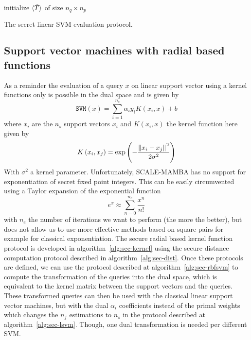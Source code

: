 \begin{center}
\begin{algorithm}[H]
\DontPrintSemicolon
initialize $\langle \tilde{T} \rangle$ of size $n_q \times n_p$ \;
\caption{The secret linear SVM evaluation protocol.}
\label{alg:sec-lsvm}
\end{algorithm}
\end{center}

\subsection{Support vector machines with radial based functions}
As a reminder the evaluation of a query $x$ on linear support vector using a kernel functions only is possible in the dual space and is given by
\begin{equation}
    \mathtt{SVM}(x) = \sum_{i=1}^{n_s} \alpha_i y_i K(x_i,x) + b
\end{equation}
where $x_i$ are the $n_s$ support vectors $x_i$ and $K(x_i,x)$ the kernel function here given by
\begin{equation}
    K\left( x_i,x_j\right) = \exp\left(-\frac{\left\lVert x_i - x_j\right\rVert^2}{2\sigma^2}\right)
\end{equation}
With $\sigma^2$ a kernel parameter. Unfortunately, SCALE-MAMBA has no support for exponentiation of secret fixed point integers. This can be easily circumvented using a Taylor expansion of the exponential function
\begin{equation}
    e^x \approx \sum_{n=0}^{n_e} \frac{x^n}{n!}
\end{equation}
with $n_e$ the number of iterations we want to perform (the more the better), but does not allow us to use more effective methods based on square pairs for example for classical exponentiation. The secure radial based kernel function protocol is developed in algorithm~\ref{alg:sec-kernel} using the secure distance computation protocol described in algorithm~\ref{alg:sec-dist}. Once these protocols are defined, we can use the protocol described at algorithm~\ref{alg:sec-rbfsvm} to compute the transformation of the queries into the dual space, which is equivalent to the kernel matrix between the support vectors and the queries. These transformed queries can then be used with the classical linear support vector machines, but with the dual $\alpha_i$ coefficients instead of the primal weights which changes the $n_f$ estimations to $n_s$ in the protocol described at algorithm~\ref{alg:sec-lsvm}. Though, one dual transformation is needed per different SVM.

